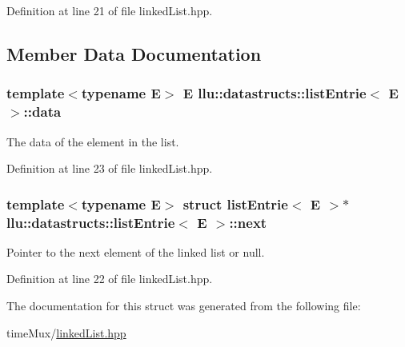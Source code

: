 Definition at line 21 of file linked\+List.\+hpp.



\subsection{Member Data Documentation}
\hypertarget{structllu_1_1datastructs_1_1list_entrie_ae45377a6f71b68a0bd56844aedc52fb7}{
\subsubsection[{data}]{\setlength{\rightskip}{0pt plus 5cm}template$<$typename E$>$ E {\bf llu\+::datastructs\+::list\+Entrie}$<$ E $>$\+::data}}\label{structllu_1_1datastructs_1_1list_entrie_ae45377a6f71b68a0bd56844aedc52fb7}


The data of the element in the list. 



Definition at line 23 of file linked\+List.\+hpp.

\hypertarget{structllu_1_1datastructs_1_1list_entrie_a3a0c3cef3ce8b0b9beaa1c6360fb6346}{
\subsubsection[{next}]{\setlength{\rightskip}{0pt plus 5cm}template$<$typename E$>$ struct {\bf list\+Entrie}$<$ E $>$$\ast$ {\bf llu\+::datastructs\+::list\+Entrie}$<$ E $>$\+::next}}\label{structllu_1_1datastructs_1_1list_entrie_a3a0c3cef3ce8b0b9beaa1c6360fb6346}


Pointer to the next element of the linked list or null. 



Definition at line 22 of file linked\+List.\+hpp.



The documentation for this struct was generated from the following file\+:\begin{DoxyCompactItemize}
\item 
time\+Mux/\hyperlink{linked_list_8hpp}{linked\+List.\+hpp}\end{DoxyCompactItemize}
